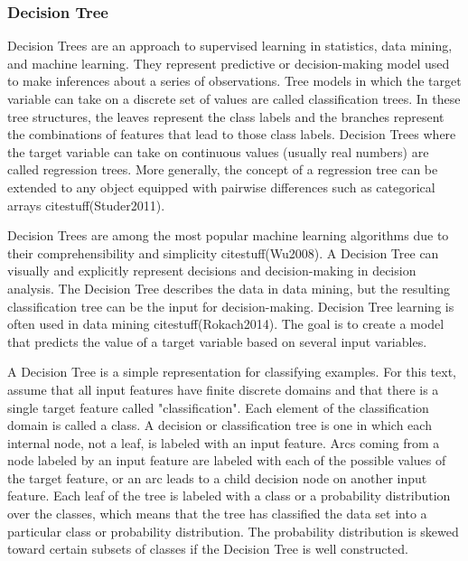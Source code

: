 \documentclass[preprint,12pt]{elsarticle}
\begin{document}
\subsubsection{Decision Tree}

Decision Trees are an approach to supervised learning in statistics, data mining, and machine learning. They represent predictive or decision-making model used to make inferences about a series of observations. Tree models in which the target variable can take on a discrete set of values are called classification trees. In these tree structures, the leaves represent the class labels and the branches represent the combinations of features that lead to those class labels. Decision Trees where the target variable can take on continuous values (usually real numbers) are called regression trees. More generally, the concept of a regression tree can be extended to any object equipped with pairwise differences such as categorical arrays citestuff(Studer2011).

Decision Trees are among the most popular machine learning algorithms due to their comprehensibility and simplicity citestuff(Wu2008). A Decision Tree can visually and explicitly represent decisions and decision-making in decision analysis. The Decision Tree describes the data in data mining, but the resulting classification tree can be the input for decision-making. Decision Tree learning is often used in data mining citestuff(Rokach2014). The goal is to create a model that predicts the value of a target variable based on several input variables.

A Decision Tree is a simple representation for classifying examples. For this text, assume that all input features have finite discrete domains and that there is a single target feature called "classification". Each element of the classification domain is called a class. A decision or classification tree is one in which each internal node, not a leaf, is labeled with an input feature. Arcs coming from a node labeled by an input feature are labeled with each of the possible values of the target feature, or an arc leads to a child decision node on another input feature. Each leaf of the tree is labeled with a class or a probability distribution over the classes, which means that the tree has classified the data set into a particular class or probability distribution. The probability distribution is skewed toward certain subsets of classes if the Decision Tree is well constructed.
\end{document}
